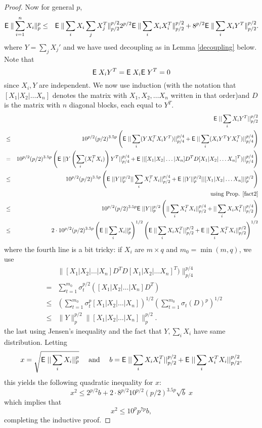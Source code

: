 \documentclass{book}
\numberwithin{exercise}{chapter}
\begin{document}
{\begin{proof}
Now for general $p$,
\begin{eqnarray*}
\hbox{{\sf E}\;}\|\sum_{i=1}^nX_i\|_p^p&\le& \hbox{{\sf E}\;}\|\sum_iX_i\sum_jX_j^T\|_{p/2}^{p/2}
2^{p/2}\hbox{{\sf E}\;}\|\sum_iX_iX_i^T\|_{p/2}^{p/2}+8^{p/2}\hbox{{\sf E}\;}\|\sum_{i}
X_iY^T\|_{p/2}^{p/2}.
\end{eqnarray*}
where $Y=\sum_jX_j'$ and we have used decoupling as in Lemma \ref{decoupling}
below. Note that
\[
\hbox{{\sf E}\;} X_iY^T=\hbox{{\sf E}\;} X_i\hbox{{\sf E}\;} Y^T=0
\]
since $X_i,Y$ are
independent. We now use induction (with the notation that
$[X_1|X_2|\ldots X_n]$ denotes the matrix with $X_1,X_2,\ldots
X_n$ written in that order)and $D$ is the matrix with $n$ diagonal
blocks, each equal to $Y^T$.
\begin{eqnarray*}
 &&\E||\sum_iX_iY^T||_{p/2}^{p/2}\\
 &\leq& 10^{p/2}(p/2)^{3.5p} \left(\E||\sum_i (YX_i^TX_iY^T)||_{p/4}^{p/4}
 +\E||\sum_i (X_iY^TYX_i^T)||_{p/4}^{p/4}\right)\\
 &=& 10^{p/2}(p/2)^{3.5p} \left(\E||Y\left( \sum_i(X_i^TX_i)\right)Y^T||_{p/4}^{p/4}
 +\E||[ X_1 | X_2|\ldots |X_n]D^TD[X_1|X_2|\ldots X_n]^T)||_{p/4}^{p/4}\right)\\
&\leq& 10^{p/2}(p/2)^{3.5p} \left(
\E||Y||_p^{p/2}||\sum_iX_i^TX_i||_{p/2}^{p/4}+
\E||Y||_p^{p/2}||[X_1|X_2|\ldots X_n]||_p^{p/2}\right)\\
&&\hfill \hbox{using Prop. \ref{fact2}}\\
&\leq& 10^{p/2}(p/2)^{3.5p} \E||Y||_p^{p/2}\left(
||\sum_iX_i^TX_i||_{p/2}^{p/4}+||\sum_iX_iX_i^T||_{p/2}^{p/4}\right)\\
 &\leq& 2\cdot 10^{p/2}(p/2)^{3.5p}\left(
\E||\sum_iX_i||_p^p\right)^{1/2}\left(
  \E||\sum_iX_iX_i^T||_{p/2}^{p/2}+\E||\sum_iX_i^TX_i||_{p/2}^{p/2}\right)^{1/2}
\end{eqnarray*}
where the fourth line is a bit tricky: if $X_i$ are $m\times q$ and
$m_0=\min (m,q)$, we use
\begin{eqnarray*}
&&\|[ X_1 | X_2|\ldots |X_n]D^TD[X_1|X_2|\ldots X_n]^T)\|_{p/4}^{p/4} \\
&=&
\sum_{t=1}^{m_0} \sigma_t^{p/2}([ X_1 | X_2|\ldots |X_n]D^T)\\
&\leq&  (\sum_{t=1}^{m_0}\sigma_t^p[ X_1 | X_2|\ldots |X_n])^{1/2}
(\sum_{t=1}^{m_0}\sigma_t(D)^p)^{1/2}\\
&\leq& \|Y\|_p^{p/2}\|[ X_1 | X_2|\ldots |X_n]\|_p^{p/2}.
\end{eqnarray*}
the last using Jensen's inequality and the fact that $Y, \sum_iX_i$ have same
distribution. Letting
\[
x=\sqrt{ \hbox{{\sf E}\;}||\sum_iX_i||_p^p} \quad \mbox{ and } \quad
b=\hbox{{\sf E}\;}||\sum_iX_iX_i^T||_{p/2}^{p/2}+\hbox{{\sf E}\;}||\sum_iX_i^TX_i||_{p/2}^{p/2},
\]
this yields the following quadratic inequality for $x$:
$$x^2\leq 2^{p/2}b+2\cdot 8^{p/2}10^{p/2}(p/2)^{3.5p}\sqrt b\; x$$
which implies that
$$x^2\leq 10^pp^{7p}b,$$
completing the inductive proof.
\end{proof}



}
\end{document}
